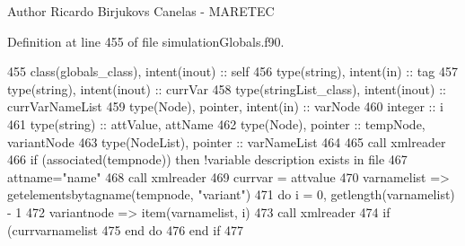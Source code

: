 \begin{DoxyAuthor}{Author}
Ricardo Birjukovs Canelas -\/ M\+A\+R\+E\+T\+EC 
\end{DoxyAuthor}


Definition at line 455 of file simulation\+Globals.\+f90.


\begin{DoxyCode}
455     \textcolor{keywordtype}{class}(globals\_class), \textcolor{keywordtype}{intent(inout)} :: self
456     \textcolor{keywordtype}{type}(string), \textcolor{keywordtype}{intent(in)} :: tag
457     \textcolor{keywordtype}{type}(string), \textcolor{keywordtype}{intent(inout)} :: currVar
458     \textcolor{keywordtype}{type}(stringList\_class), \textcolor{keywordtype}{intent(inout)} :: currVarNameList
459     \textcolor{keywordtype}{type}(Node), \textcolor{keywordtype}{pointer}, \textcolor{keywordtype}{intent(in)} :: varNode
460     \textcolor{keywordtype}{integer} :: i
461     \textcolor{keywordtype}{type}(string) :: attValue, attName
462     \textcolor{keywordtype}{type}(Node), \textcolor{keywordtype}{pointer} :: tempNode, variantNode
463     \textcolor{keywordtype}{type}(NodeList), \textcolor{keywordtype}{pointer} :: varNameList
464 
465     \textcolor{keyword}{call }xmlreader%
466     \textcolor{keywordflow}{if} (\textcolor{keyword}{associated}(tempnode)) \textcolor{keywordflow}{then} \textcolor{comment}{!variable description exists in file}
467         attname=\textcolor{stringliteral}{"name"}
468         \textcolor{keyword}{call }xmlreader%
469         currvar = attvalue
470         varnamelist => getelementsbytagname(tempnode, \textcolor{stringliteral}{"variant"})
471         \textcolor{keywordflow}{do} i = 0, getlength(varnamelist) - 1
472             variantnode => item(varnamelist, i)
473             \textcolor{keyword}{call }xmlreader%
474             \textcolor{keywordflow}{if} (currvarnamelist%
475 \textcolor{keywordflow}{        end do}
476 \textcolor{keywordflow}{    end if}
477 
\end{DoxyCode}
\mbox{\label{namespacesimulationglobals__mod_aa01e0a958ef2e94a02991dcfe390bfa0}} 
